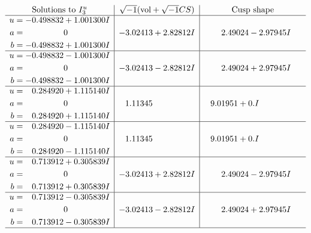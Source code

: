 \documentclass[1p]{elsarticle_modified}
\theoremstyle{definition}
\newcommand{\I}{\sqrt{-1}}
\begin{document}
$$\begin{array}{c|c|c}  
\text{Solutions to }I^u_{3}& \I (\text{vol} + \sqrt{-1}CS) & \text{Cusp shape}\\
 \hline 
\begin{aligned}
u &= -0.498832 + 1.001300 I \\
a &= \phantom{-0.000000 } 0 \\
b &= -0.498832 + 1.001300 I\end{aligned}
 & -3.02413 + 2.82812 I & \phantom{-}2.49024 - 2.97945 I \\ \hline\begin{aligned}
u &= -0.498832 - 1.001300 I \\
a &= \phantom{-0.000000 } 0 \\
b &= -0.498832 - 1.001300 I\end{aligned}
 & -3.02413 - 2.82812 I & \phantom{-}2.49024 + 2.97945 I \\ \hline\begin{aligned}
u &= \phantom{-}0.284920 + 1.115140 I \\
a &= \phantom{-0.000000 } 0 \\
b &= \phantom{-}0.284920 + 1.115140 I\end{aligned}
 & \phantom{-}1.11345\phantom{ +0.000000I} & \phantom{-}9.01951 + 0. I\phantom{ +0.000000I} \\ \hline\begin{aligned}
u &= \phantom{-}0.284920 - 1.115140 I \\
a &= \phantom{-0.000000 } 0 \\
b &= \phantom{-}0.284920 - 1.115140 I\end{aligned}
 & \phantom{-}1.11345\phantom{ +0.000000I} & \phantom{-}9.01951 + 0. I\phantom{ +0.000000I} \\ \hline\begin{aligned}
u &= \phantom{-}0.713912 + 0.305839 I \\
a &= \phantom{-0.000000 } 0 \\
b &= \phantom{-}0.713912 + 0.305839 I\end{aligned}
 & -3.02413 + 2.82812 I & \phantom{-}2.49024 - 2.97945 I \\ \hline\begin{aligned}
u &= \phantom{-}0.713912 - 0.305839 I \\
a &= \phantom{-0.000000 } 0 \\
b &= \phantom{-}0.713912 - 0.305839 I\end{aligned}
 & -3.02413 - 2.82812 I & \phantom{-}2.49024 + 2.97945 I\\
 \hline 
 \end{array}$$\newpage\newpage\renewcommand{\arraystretch}{1}
\end{document}
